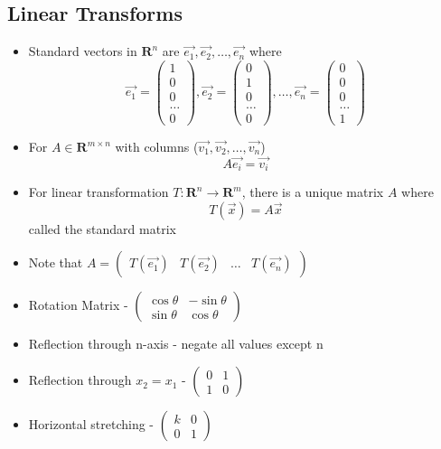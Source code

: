 \documentclass{article}
\begin{document}
\subsection{Linear Transforms}
\begin{itemize}
    \item Standard vectors in \(\textbf{R}^n\) are \(\vec{e_1},\vec{e_2},\dots,\vec{e_n}\) where 
    \[\vec{e_1}=\begin{pmatrix} 1\\0\\0\\\dots\\0\end{pmatrix},\vec{e_2}=\begin{pmatrix} 0\\1\\0\\\dots\\0\end{pmatrix},\dots,\vec{e_n}=\begin{pmatrix} 0\\0\\0\\\dots\\1\end{pmatrix} \]
    \item For \(A\in\textbf{R}^{m\times n}\) with columns (\(\vec{v_1},\vec{v_2},\dots,\vec{v_n}\))
    \[A\vec{e_i}=\vec{v_i}\]
    \item For linear transformation \(T:\textbf{R}^n\rightarrow\textbf{R}^m\), there is a unique matrix \(A\) where \[T(\vec{x})=A\vec{x}\] called the standard matrix
    \item Note that \(A=\begin{pmatrix} T(\vec{e_1}) & T(\vec{e_2}) & \dots & T(\vec{e_n}) \end{pmatrix}\)
    \item Rotation Matrix - \(\begin{pmatrix} \cos{\theta}& -\sin{\theta} \\ \sin{\theta}&\cos{\theta}\end{pmatrix}\)
    \item Reflection through n-axis - negate all values except n 
    \item Reflection through \(x_2=x_1\) - \(\begin{pmatrix} 0&1 \\ 1&0 \end{pmatrix}\)
    \item Horizontal stretching - \(\begin{pmatrix} k&0 \\ 0&1 \end{pmatrix}\)

\end{itemize}
\end{document}
